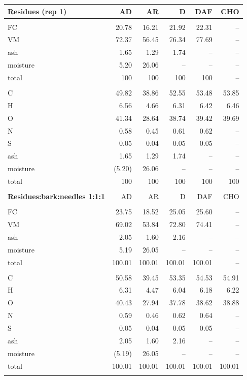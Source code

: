 \begin{longtable}{lrrrrr}
    \textbf{Residues (rep 1)} & AD & AR & D & DAF & CHO \\
    \hline \\
    FC       & 20.78  & 16.21  & 21.92  & 22.31  & -- \\
    VM       & 72.37  & 56.45  & 76.34  & 77.69  & -- \\
    ash      & 1.65   & 1.29   & 1.74   & --     & -- \\
    moisture & 5.20   & 26.06  & --     & --     & -- \\
    total    & 100    & 100    & 100    & 100    & -- \\
    \\
    C        & 49.82  & 38.86  & 52.55  & 53.48  & 53.85 \\
    H        & 6.56   & 4.66   & 6.31   & 6.42   & 6.46 \\
    O        & 41.34  & 28.64  & 38.74  & 39.42  & 39.69 \\
    N        & 0.58   & 0.45   & 0.61   & 0.62   & -- \\
    S        & 0.05   & 0.04   & 0.05   & 0.05   & -- \\
    ash      & 1.65   & 1.29   & 1.74   & --     & -- \\
    moisture & (5.20) & 26.06  & --     & --     & -- \\
    total    & 100    & 100    & 100    & 100    & 100 \\
    \\

    \textbf{Residues:bark:needles 1:1:1} & AD & AR & D & DAF & CHO \\
    \hline \\
    FC       & 23.75  & 18.52  & 25.05  & 25.60  & -- \\
    VM       & 69.02  & 53.84  & 72.80  & 74.41  & -- \\
    ash      & 2.05   & 1.60   & 2.16   & --     & -- \\
    moisture & 5.19   & 26.05  & --     & --     & -- \\
    total    & 100.01 & 100.01 & 100.01 & 100.01 & -- \\
    \\
    C        & 50.58  & 39.45  & 53.35  & 54.53  & 54.91 \\
    H        & 6.31   & 4.47   & 6.04   & 6.18   & 6.22 \\
    O        & 40.43  & 27.94  & 37.78  & 38.62  & 38.88 \\
    N        & 0.59   & 0.46   & 0.62   & 0.64   & -- \\
    S        & 0.05   & 0.04   & 0.05   & 0.05   & -- \\
    ash      & 2.05   & 1.60   & 2.16   & --     & -- \\
    moisture & (5.19) & 26.05  & --     & --     & -- \\
    total    & 100.01 & 100.01 & 100.01 & 100.01 & 100.01 \\
    \\


\end{longtable}
